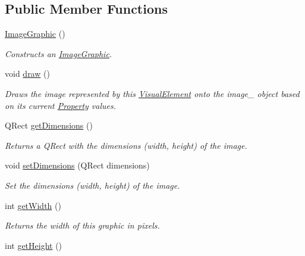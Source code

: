 \subsection*{Public Member Functions}
\begin{DoxyCompactItemize}
\item 
\hyperlink{class_picto_1_1_image_graphic_ad954ec9ce5ce2a60872dc91272bb73e6}{Image\-Graphic} ()
\begin{DoxyCompactList}\small\item\em Constructs an \hyperlink{class_picto_1_1_image_graphic}{Image\-Graphic}. \end{DoxyCompactList}\item 
\hypertarget{class_picto_1_1_image_graphic_a08595130478473fd2f0fe667b3f5c34f}{void \hyperlink{class_picto_1_1_image_graphic_a08595130478473fd2f0fe667b3f5c34f}{draw} ()}\label{class_picto_1_1_image_graphic_a08595130478473fd2f0fe667b3f5c34f}

\begin{DoxyCompactList}\small\item\em Draws the image represented by this \hyperlink{struct_picto_1_1_visual_element}{Visual\-Element} onto the image\-\_\- object based on its current \hyperlink{class_picto_1_1_property}{Property} values. \end{DoxyCompactList}\item 
Q\-Rect \hyperlink{class_picto_1_1_image_graphic_a7e94b9754ba95c0c8e5555a8b498d165}{get\-Dimensions} ()
\begin{DoxyCompactList}\small\item\em Returns a Q\-Rect with the dimensions (width, height) of the image. \end{DoxyCompactList}\item 
void \hyperlink{class_picto_1_1_image_graphic_a50775441fbc3a1a75f7093e026ab76f6}{set\-Dimensions} (Q\-Rect dimensions)
\begin{DoxyCompactList}\small\item\em Set the dimensions (width, height) of the image. \end{DoxyCompactList}\item 
\hypertarget{class_picto_1_1_image_graphic_acbb66c0f68bef4e4eff4b749b2eccaeb}{int \hyperlink{class_picto_1_1_image_graphic_acbb66c0f68bef4e4eff4b749b2eccaeb}{get\-Width} ()}\label{class_picto_1_1_image_graphic_acbb66c0f68bef4e4eff4b749b2eccaeb}

\begin{DoxyCompactList}\small\item\em Returns the width of this graphic in pixels. \end{DoxyCompactList}\item 
\hypertarget{class_picto_1_1_image_graphic_a09f0b14f668c00c19dd584f5908f13ed}{int \hyperlink{class_picto_1_1_image_graphic_a09f0b14f668c00c19dd584f5908f13ed}{get\-Height} ()}\label{class_picto_1_1_image_graphic_a09f0b14f668c00c19dd584f5908f13ed}


\end{DoxyCompactItemize}
